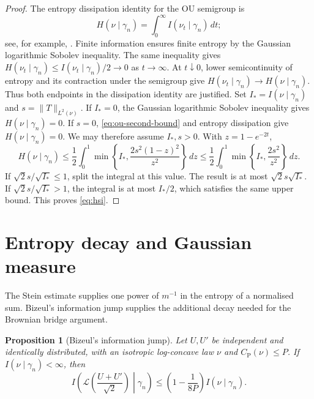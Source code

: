 \documentclass[11pt]{amsart}
\numberwithin{equation}{section}
\newtheorem{proposition}[theorem]{Proposition}
\theoremstyle{definition}
\theoremstyle{remark}
\newcommand{\gam}{\gamma_n}
\newcommand{\CP}{C_{\mathrm P}}
\newcommand{\norm}[1]{\lVert #1\rVert}
\begin{document}
\begin{proof}
The entropy dissipation identity for the OU semigroup is
\[
H(\nu\mid\gam)=\int_0^\infty I(\nu_t\mid\gam)\,dt;
\]
see, for example, \cite{BGL14}. Finite information ensures finite
entropy by the Gaussian logarithmic Sobolev inequality. The same
inequality gives
\(H(\nu_t\mid\gam)\le I(\nu_t\mid\gam)/2\to0\) as \(t\to\infty\).
At \(t\downarrow0\), lower semicontinuity of entropy and its contraction
under the semigroup give \(H(\nu_t\mid\gam)\to H(\nu\mid\gam)\).
Thus both endpoints in the dissipation identity are justified. Set
\(I_*=I(\nu\mid\gam)\) and \(s=\norm T_{L^2(\nu)}\).
If \(I_*=0\), the Gaussian logarithmic Sobolev inequality gives
\(H(\nu\mid\gam)=0\).
If \(s=0\), \eqref{eq:ou-second-bound} and entropy dissipation give
\(H(\nu\mid\gam)=0\). We may therefore assume \(I_*,s>0\). With
\(z=1-e^{-2t}\),
\[
H(\nu\mid\gam)
\le\frac12\int_0^1
 \min\left\{I_*,\frac{2s^2(1-z)^2}{z^2}\right\}\,dz
\le\frac12\int_0^1
 \min\left\{I_*,\frac{2s^2}{z^2}\right\}\,dz.
\]
If \(\sqrt2s/\sqrt{I_*}\le1\), split the integral at this value. The
result is at most \(\sqrt2s\sqrt{I_*}\). If
\(\sqrt2s/\sqrt{I_*}>1\), the integral is at most \(I_*/2\), which
satisfies the same upper bound. This proves
\eqref{eq:hsi}.
\end{proof}

\section{Entropy decay and Gaussian measure}
\label{sec:entropy}

The Stein estimate supplies one power of \(m^{-1}\) in the entropy of a
normalised sum. Bizeul's information jump supplies the additional decay
needed for the Brownian bridge argument.

\begin{proposition}[Bizeul's information jump]\label{prop:fisher-jump}
Let \(U,U'\) be independent and identically distributed, with an
isotropic log-concave law \(\nu\) and
\(\CP(\nu)\le P\). If \(I(\nu\mid\gam)<\infty\), then
\begin{equation}\label{eq:fisher-jump}
I\left(\mathcal L\left(\frac{U+U'}{\sqrt2}\right)\middle|\gam\right)
\le \left(1-\frac1{8P}\right)I(\nu\mid\gam).
\end{equation}
\end{proposition}
\end{document}
